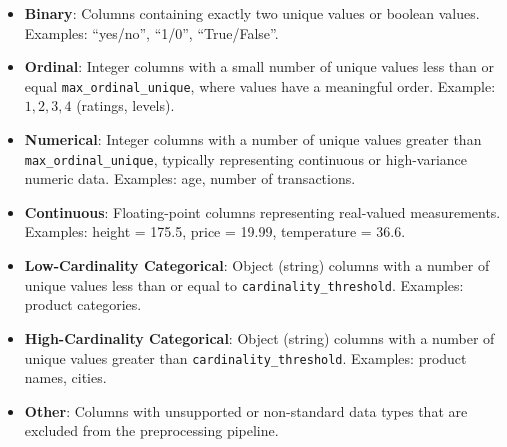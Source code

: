 \begin{itemize}
    \item \textbf{Binary}: Columns containing exactly two unique values or boolean values.  
    Examples: ``yes/no'', ``1/0'', ``True/False''.

    \item \textbf{Ordinal}: Integer columns with a small number of unique values less than or equal \texttt{max\_ordinal\_unique}, where values have a meaningful order.  
    Example: $1, 2, 3, 4$ (ratings, levels).

    \item \textbf{Numerical}: Integer columns with a number of unique values greater than \texttt{max\_ordinal\_unique}, typically representing continuous or high-variance numeric data.  
    Examples: age, number of transactions.

    \item \textbf{Continuous}: Floating-point columns representing real-valued measurements.  
    Examples: height = 175.5, price = 19.99, temperature = 36.6.

    \item \textbf{Low-Cardinality Categorical}: Object (string) columns with a number of unique values less than or equal to \texttt{cardinality\_threshold}.  
    Examples: product categories.

    \item \textbf{High-Cardinality Categorical}: Object (string) columns with a number of unique values greater than \texttt{cardinality\_threshold}.  
    Examples: product names, cities.

    \item \textbf{Other}: Columns with unsupported or non-standard data types that are excluded from the preprocessing pipeline.  
  
\end{itemize}
\vspace{1cm}
